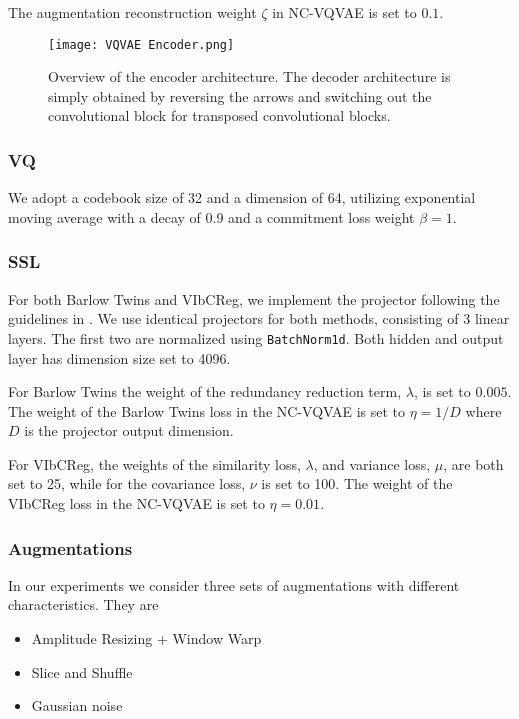 \documentclass[../../thesis.tex]{subfiles}
\begin{document}
The augmentation reconstruction weight $\zeta$ in NC-VQVAE is set to $0.1$.  

\begin{figure}[h]
    
    \texttt{[image: VQVAE Encoder.png]}
    \centering
    \caption{Overview of the encoder architecture. The decoder architecture is simply obtained by reversing the arrows and switching out the convolutional block for transposed convolutional blocks.}
    \label{fig:VQVAE Encoder}
\end{figure}

\subsubsection{VQ}
We adopt a codebook size of 32 and a dimension of 64, utilizing exponential moving average with a decay of 0.9 and a commitment loss weight $\beta = 1$.

\subsubsection{SSL}
For both Barlow Twins and VIbCReg, we implement the projector following the guidelines in \cite{lee2024computer}. 
We use identical projectors for both methods, consisting of 3 linear layers. The first two are normalized using \texttt{BatchNorm1d}. Both hidden and output layer has dimension size set to 4096.\newline

For Barlow Twins the weight of the redundancy reduction term, $\lambda$, is set to $0.005$. The weight of the Barlow Twins loss in the NC-VQVAE is set to $\eta = 1/D$ where $D$ is the projector output dimension.\newline

For VIbCReg, the weights of the similarity loss, $\lambda$, and variance loss, $\mu$, are both set to 25, while for the covariance loss, $\nu$ is set to 100. The weight of the VIbCReg loss in the NC-VQVAE is set to $\eta = 0.01$.\newline


\subsubsection{Augmentations}
In our experiments we consider three sets of augmentations with different characteristics. They are
\begin{itemize}
    \item Amplitude Resizing + Window Warp
    \item Slice and Shuffle
    \item Gaussian noise
\end{itemize}
\end{document}
